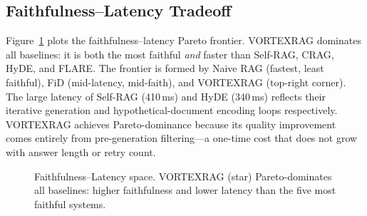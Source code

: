 \documentclass[10pt,twocolumn]{article}
\begin{document}
\subsection{Faithfulness--Latency Tradeoff}

Figure~\ref{fig:pareto} plots the faithfulness--latency Pareto frontier.
VORTEXRAG dominates all baselines: it is both the most faithful \emph{and}
faster than Self-RAG, CRAG, HyDE, and FLARE.  The frontier is formed by Naive
RAG (fastest, least faithful), FiD (mid-latency, mid-faith), and VORTEXRAG
(top-right corner).  The large latency of Self-RAG (410\,ms) and HyDE
(340\,ms) reflects their iterative generation and hypothetical-document
encoding loops respectively.  VORTEXRAG achieves Pareto-dominance because
its quality improvement comes entirely from pre-generation filtering---a
one-time cost that does not grow with answer length or retry count.

\begin{figure}[h]
\centering
{}
\caption{Faithfulness--Latency space.  VORTEXRAG (star) Pareto-dominates all
baselines: higher faithfulness and lower latency than the five most faithful
systems.}
\label{fig:pareto}
\end{figure}
\end{document}
